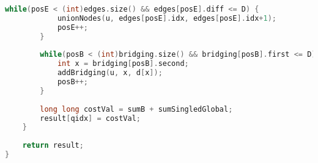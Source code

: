 \begin{lstlisting}[language=C++]
        while(posE < (int)edges.size() && edges[posE].diff <= D) {
            unionNodes(u, edges[posE].idx, edges[posE].idx+1);
            posE++;
        }
 
        while(posB < (int)bridging.size() && bridging[posB].first <= D) {
            int x = bridging[posB].second;
            addBridging(u, x, d[x]);
            posB++;
        }
 
        long long costVal = sumB + sumSingledGlobal;
        result[qidx] = costVal;
    }
 
    return result;
}
\end{lstlisting}
